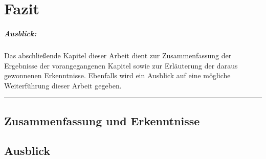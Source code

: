 
\chapter{Fazit}
\label{conclusion}

\paragraph{Ausblick:}
Das abschließende Kapitel dieser Arbeit dient zur Zusammenfassung der Ergebnisse der vorangegangenen Kapitel sowie zur Erläuterung der daraus gewonnenen Erkenntnisse. Ebenfalls wird ein Ausblick auf eine mögliche Weiterführung dieser Arbeit gegeben.
\\
\hrule

\section{Zusammenfassung und Erkenntnisse}

\section{Ausblick}

\cleardoublepage